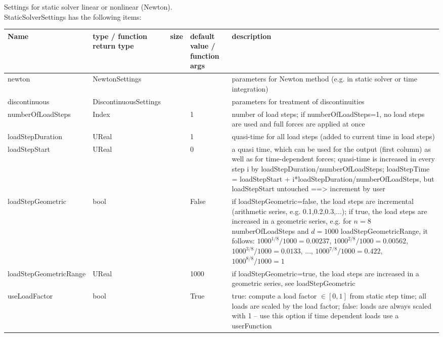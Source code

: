  \label{sec:StaticSolverSettings}
Settings for static solver linear or nonlinear (Newton).\\ 
%
StaticSolverSettings has the following items:
\begin{center}
  \footnotesize
  \begin{longtable}{| p{4.2cm} | p{2.5cm} | p{0.3cm} | p{3.0cm} | p{6cm} |}
    \hline
    \bf Name & \bf type / function return type & \bf size & \bf default value / function args & \bf description \\ \hline
    newton &     NewtonSettings &      &      &     parameters for Newton method (e.g. in static solver or time integration)\\ \hline
    discontinuous &     DiscontinuousSettings &      &      &     parameters for treatment of discontinuities\\ \hline
    numberOfLoadSteps &     Index &      &     1 &     number of load steps; if numberOfLoadSteps=1, no load steps are used and full forces are applied at once\\ \hline
    loadStepDuration &     UReal &      &     1 &     quasi-time for all load steps (added to current time in load steps)\\ \hline
    loadStepStart &     UReal &      &     0 &     a quasi time, which can be used for the output (first column) as well as for time-dependent forces; quasi-time is increased in every step i by loadStepDuration/numberOfLoadSteps; loadStepTime = loadStepStart + i*loadStepDuration/numberOfLoadSteps, but loadStepStart untouched ==> increment by user\\ \hline
    loadStepGeometric &     bool &      &     False &     if loadStepGeometric=false, the load steps are incremental (arithmetic series, e.g. 0.1,0.2,0.3,...); if true, the load steps are increased in a geometric series, e.g. for $n=8$ numberOfLoadSteps and $d = 1000$ loadStepGeometricRange, it follows: $1000^{1/8}/1000=0.00237$, $1000^{2/8}/1000=0.00562$, $1000^{3/8}/1000=0.0133$, ..., $1000^{7/8}/1000=0.422$, $1000^{8/8}/1000=1$\\ \hline
    loadStepGeometricRange &     UReal &      &     1000 &     if loadStepGeometric=true, the load steps are increased in a geometric series, see loadStepGeometric\\ \hline
    useLoadFactor &     bool &      &     True &     true: compute a load factor $\in [0,1]$ from static step time; all loads are scaled by the load factor; false: loads are always scaled with 1 -- use this option if time dependent loads use a userFunction\\ \hline

\end{longtable}
\end{center}
